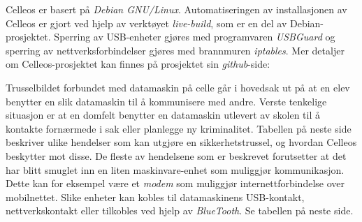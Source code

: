 
Celleos er basert p\aa{} {\it Debian GNU/Linux}. Automatiseringen av installasjonen av Celleos er gjort ved hjelp av verkt\o yet {\it live-build}, som er en del av Debian-prosjektet. Sperring av USB-enheter gj\o res med programvaren {\it USBGuard} og sperring av nettverksforbindelser gj\o res med brannmuren {\it iptables}. Mer detaljer om Celleos-prosjektet kan finnes p\aa{} prosjektet sin {\it github}-side:
\smallskip
{}


Trusselbildet forbundet med datamaskin p\aa{} celle g\aa r i hovedsak ut p\aa{} at en elev benytter en slik datamaskin til \aa{} kommunisere med andre. Verste tenkelige situasjon er at en domfelt benytter en datamaskin utlevert av skolen til \aa{} kontakte forn\ae rmede i sak eller planlegge ny kriminalitet.
Tabellen p\aa{} neste side beskriver ulike hendelser som kan utgj\o re en sikkerhetstrussel, og hvordan Celleos beskytter mot disse. De fleste av hendelsene som er beskrevet forutsetter at det har blitt smuglet inn en liten maskinvare-enhet som muliggj\o r kommunikasjon. Dette kan for eksempel v\ae re et {\it modem} som muliggj\o r internettforbindelse over mobilnettet. Slike enheter kan kobles til datamaskinens USB-kontakt, nettverkskontakt eller tilkobles ved hjelp av {\it BlueTooth}. Se tabellen p\aa{} neste side.

\vfill\eject
\topglue 1pc

\def\firstcolwidth{12pc}
\def\secondcolwidth{19pc}
\def\tablerow#1#2{
\vbox{
\btexdraw
\drawdim pc
\textref h:L v:T
\move(0 0) \htext{\vbox{\hsize=\firstcolwidth \noindent\raggedright #1}}
\move(16 0) \htext{\vbox{\hsize=\secondcolwidth \noindent\raggedright #2}}
\etexdraw
}}
\def\tablehline{
\vbox{
\btexdraw
\drawdim pc
\move(0 0) \linewd 0.01 \lvec(35 0)
\etexdraw}
}

\def\tabletopline{
\vbox{
\btexdraw
\drawdim pc
\move(0 0) \linewd 0.07 \lvec(35 0)
\move(0 0.1) \linewd 0.02 \lvec(35 0.1)
\etexdraw}
}
\def\tablebottomline{
\vbox{
\btexdraw
\drawdim pc
\move(0 0) \linewd 0.07 \lvec(35 0)
\move(0 -0.1) \linewd 0.02 \lvec(35 -0.1)
\etexdraw}
}

